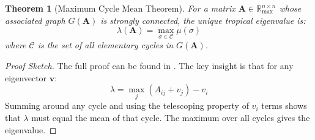 \documentclass[11pt,a4paper]{article}
\theoremstyle{plain}
\newtheorem{theorem}{Theorem}[section]
\theoremstyle{definition}
\newcommand{\Rmax}{\mathbb{R}_{\max}}
\newcommand{\mat}[1]{\mathbf{#1}}
\newcommand{\vect}[1]{\mathbf{#1}}
\begin{document}
\begin{theorem}[Maximum Cycle Mean Theorem]
\label{thm:mcm}
For a matrix $\mat{A} \in \Rmax^{n \times n}$ whose associated graph $G(\mat{A})$ is strongly connected, the unique tropical eigenvalue is:
\begin{equation}
    \lambda(\mat{A}) = \max_{\sigma \in \mathcal{C}} \mu(\sigma)
\end{equation}
where $\mathcal{C}$ is the set of all elementary cycles in $G(\mat{A})$.
\end{theorem}

\begin{proof}[Proof Sketch]
The full proof can be found in \cite{baccelli1992synchronization, butkovic2010max}. The key insight is that for any eigenvector $\vect{v}$:
\begin{equation}
    \lambda = \max_j (A_{ij} + v_j) - v_i
\end{equation}
Summing around any cycle and using the telescoping property of $v_i$ terms shows that $\lambda$ must equal the mean of that cycle. The maximum over all cycles gives the eigenvalue.
\end{proof}
\end{document}
